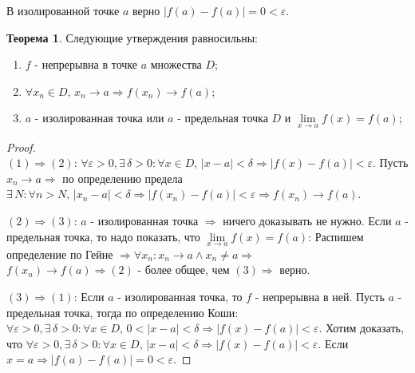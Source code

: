 \documentclass[12pt]{article}
\theoremstyle{definition}
\newtheorem{theorem}{Теорема}
\begin{document}
В изолированной точке $a$ верно $|f(a) - f(a)| = 0 < \varepsilon$.

\begin{theorem}
	Следующие утверждения равносильны:
	\begin{enumerate}[label={(\arabic*)}]
		\item $f$ - непрерывна в точке $a$ множества $D$;
		\item $\forall x_n \in D, \, x_n \to a \Rightarrow f(x_n) \to f(a)$;
		\item $a$ - изолированная точка или $a$ - предельная точка $D$ и $\lim\limits_{x \to a} f(x) = f(a)$; 
	\end{enumerate}
\end{theorem}

\begin{proof}\hfill\\
	$(1) \Rightarrow (2)$: $\forall \varepsilon > 0, \exists \, \delta > 0 \colon \forall x \in D, \, |x-a| < \delta \Rightarrow |f(x) - f(a)| < \varepsilon$. Пусть $x_n \to a \Rightarrow$ по определению предела $\exists \, N \colon \forall n > N, \, |x_n - a|  < \delta \Rightarrow |f(x_n) - f(a)| < \varepsilon \Rightarrow f(x_n) \to f(a)$. 
	
	$(2) \Rightarrow (3)$: $a$ - изолированная точка $\Rightarrow$ ничего доказывать не нужно. Если $a$ - предельная точка, то надо показать, что $\lim\limits_{x \to a} f(x) = f(a)$: Распишем определение по Гейне $\Rightarrow \forall x_n \colon x_n \to a \wedge x_n \neq a \Rightarrow$\\ $f(x_n) \to f(a) \Rightarrow (2)$ - более общее, чем $(3) \Rightarrow$ верно.
	
	$(3) \Rightarrow (1)$: Если $a$ - изолированная точка, то $f$ - непрерывна в ней. Пусть $a$ - предельная точка, тогда по определению Коши: $\forall \varepsilon >0, \exists \, \delta > 0 \colon \forall x \in D, \, 0 < |x - a| < \delta \Rightarrow |f(x) - f(a)| < \varepsilon$. Хотим доказать, что  $\forall \varepsilon >0, \exists \, \delta > 0 \colon \forall x \in D, \, |x - a| < \delta \Rightarrow |f(x) - f(a)| < \varepsilon$. Если $x = a \Rightarrow |f(a) - f(a)| = 0 < \varepsilon$.
\end{proof}
\end{document}
